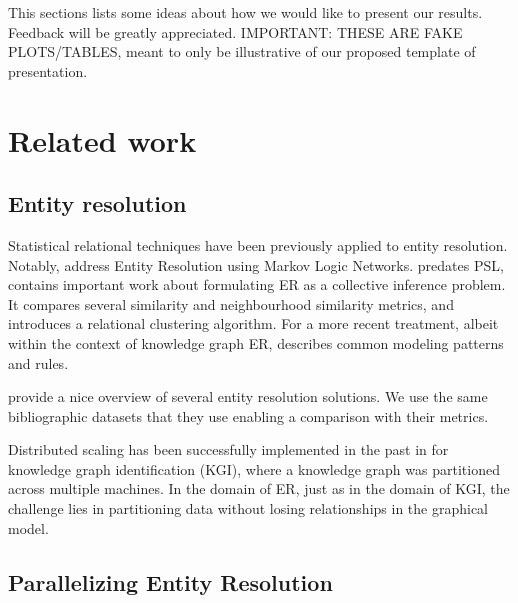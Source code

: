 \documentclass{article}
\begin{document}
This sections lists some ideas about how we would like to present our results. Feedback will be greatly appreciated. IMPORTANT: THESE ARE FAKE PLOTS/TABLES, meant to only be illustrative of our proposed template of presentation.

\section{Related work}

\subsection{Entity resolution}

Statistical relational techniques have been previously applied to entity resolution. Notably, \cite{singla2006entity} address Entity Resolution using Markov Logic Networks.  \cite{bhattacharya:thesis06} predates PSL, contains important work about formulating ER as a collective inference problem. It compares several similarity and neighbourhood similarity metrics, and introduces a relational clustering algorithm. For a more recent treatment, albeit within the context of knowledge graph ER, \cite{pujara:starai16} describes common modeling patterns and rules.

\cite{kopcke2010frameworks} provide a nice overview of several entity resolution solutions. We use the same bibliographic datasets that they use enabling a comparison with their metrics.

Distributed scaling has been successfully implemented in the past in \cite{pujara:thesis16} for knowledge graph identification (KGI), where a knowledge graph was partitioned across multiple machines. In the domain of ER, just as in the domain of KGI, the challenge lies in partitioning data without losing relationships in the graphical model.

\subsection{Parallelizing Entity Resolution}
\end{document}
